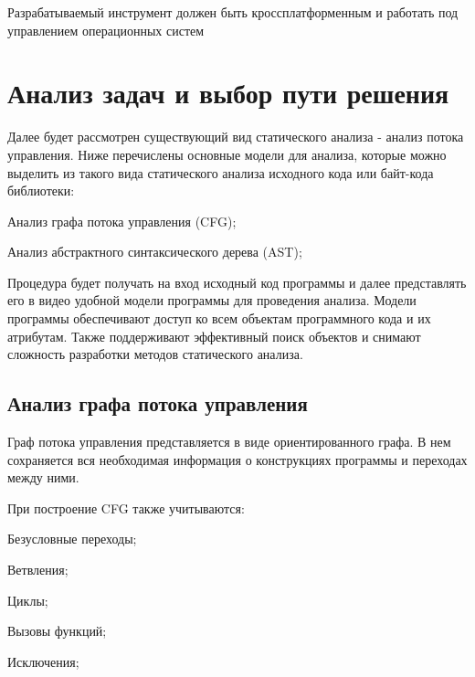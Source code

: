 Разрабатываемый инструмент должен быть кроссплатформенным и работать под управлением операционных систем

\section{Анализ задач и выбор пути решения}

Далее будет рассмотрен существующий вид статического анализа - анализ потока управления.
Ниже перечислены основные модели для анализа, которые можно выделить из такого вида статического анализа исходного кода или байт-кода библиотеки:
%
\begin{itemize*}
\item Анализ графа потока управления (CFG);
\item Анализ абстрактного синтаксического дерева (AST);
\end{itemize*}
%

Процедура будет получать на вход исходный код программы и далее представлять его в видео удобной модели программы для проведения анализа.
Модели программы обеспечивают доступ ко всем объектам программного кода и их атрибутам. Также поддерживают эффективный поиск объектов и снимают сложность разработки методов статического анализа.

\subsection{Анализ графа потока управления}

Граф потока управления представляется в виде ориентированного графа. В нем сохраняется вся необходимая информация о конструкциях программы и переходах между ними.

При построение CFG также учитываются:
%
\begin{itemize*}
\item Безусловные переходы;
\item Ветвления;
\item Циклы;
\item Вызовы функций;
\item Исключения;
\end{itemize*}
%

